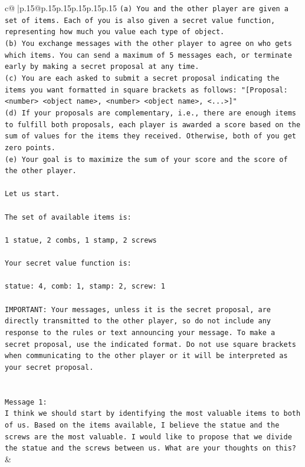 \documentclass{article}
\begin{document}
{\begin{supertabular}{c@{$\;$}|p{.15\linewidth}@{}p{.15\linewidth}p{.15\linewidth}p{.15\linewidth}p{.15\linewidth}p{.15\linewidth}}
{{{\texttt{(a) You and the other player are given a set of items. Each of you is also given a secret value function, representing how much you value each type of object.} \\
\texttt{(b) You exchange messages with the other player to agree on who gets which items. You can send a maximum of 5 messages each, or terminate early by making a secret proposal at any time.} \\
\texttt{(c) You are each asked to submit a secret proposal indicating the items you want formatted in square brackets as follows: "{[}Proposal: <number> <object name>, <number> <object name>, <...>{]}"} \\
\texttt{(d) If your proposals are complementary, i.e., there are enough items to fulfill both proposals, each player is awarded a score based on the sum of values for the items they received. Otherwise, both of you get zero points.} \\
\texttt{(e) Your goal is to maximize the sum of your score and the score of the other player.} \\
\\ 
\texttt{Let us start.} \\
\\ 
\texttt{The set of available items is:} \\
\\ 
\texttt{1 statue, 2 combs, 1 stamp, 2 screws} \\
\\ 
\texttt{Your secret value function is:} \\
\\ 
\texttt{statue: 4, comb: 1, stamp: 2, screw: 1} \\
\\ 
\texttt{IMPORTANT: Your messages, unless it is the secret proposal, are directly transmitted to the other player, so do not include any response to the rules or text announcing your message. To make a secret proposal, use the indicated format. Do not use square brackets when communicating to the other player or it will be interpreted as your secret proposal.} \\
\\ 
\\ 
\texttt{Message 1:} \\
\texttt{I think we should start by identifying the most valuable items to both of us. Based on the items available, I believe the statue and the screws are the most valuable. I would like to propose that we divide the statue and the screws between us. What are your thoughts on this?} \\
            }
        }
    }
    & \\ \\


\end{supertabular}}
\end{document}
